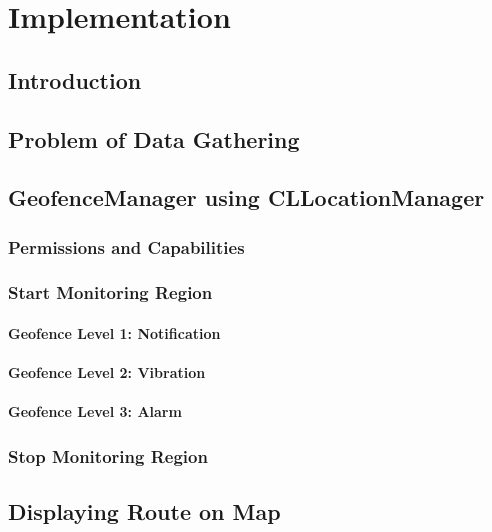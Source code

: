 \chapter{Implementation}
\label{cha:Implementation}

\section{Introduction}

\section{Problem of Data Gathering}

\section{GeofenceManager using CLLocationManager}
\subsection{Permissions and Capabilities}
\subsection{Start Monitoring Region}
\subsubsection{Geofence Level 1: Notification}
\subsubsection{Geofence Level 2: Vibration}
\subsubsection{Geofence Level 3: Alarm}
\subsection{Stop Monitoring Region}

\section{Displaying Route on Map}
